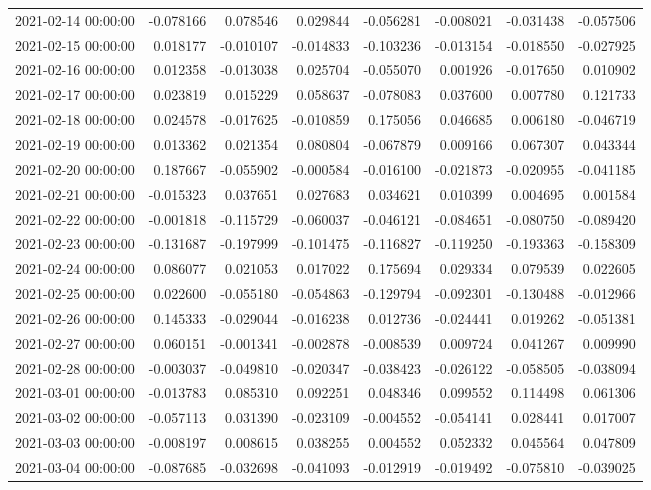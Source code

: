 \begin{tabular}{lrrrrrrr}
2021-02-14 00:00:00 & -0.078166 & 0.078546 & 0.029844 & -0.056281 & -0.008021 & -0.031438 & -0.057506 \\
2021-02-15 00:00:00 & 0.018177 & -0.010107 & -0.014833 & -0.103236 & -0.013154 & -0.018550 & -0.027925 \\
2021-02-16 00:00:00 & 0.012358 & -0.013038 & 0.025704 & -0.055070 & 0.001926 & -0.017650 & 0.010902 \\
2021-02-17 00:00:00 & 0.023819 & 0.015229 & 0.058637 & -0.078083 & 0.037600 & 0.007780 & 0.121733 \\
2021-02-18 00:00:00 & 0.024578 & -0.017625 & -0.010859 & 0.175056 & 0.046685 & 0.006180 & -0.046719 \\
2021-02-19 00:00:00 & 0.013362 & 0.021354 & 0.080804 & -0.067879 & 0.009166 & 0.067307 & 0.043344 \\
2021-02-20 00:00:00 & 0.187667 & -0.055902 & -0.000584 & -0.016100 & -0.021873 & -0.020955 & -0.041185 \\
2021-02-21 00:00:00 & -0.015323 & 0.037651 & 0.027683 & 0.034621 & 0.010399 & 0.004695 & 0.001584 \\
2021-02-22 00:00:00 & -0.001818 & -0.115729 & -0.060037 & -0.046121 & -0.084651 & -0.080750 & -0.089420 \\
2021-02-23 00:00:00 & -0.131687 & -0.197999 & -0.101475 & -0.116827 & -0.119250 & -0.193363 & -0.158309 \\
2021-02-24 00:00:00 & 0.086077 & 0.021053 & 0.017022 & 0.175694 & 0.029334 & 0.079539 & 0.022605 \\
2021-02-25 00:00:00 & 0.022600 & -0.055180 & -0.054863 & -0.129794 & -0.092301 & -0.130488 & -0.012966 \\
2021-02-26 00:00:00 & 0.145333 & -0.029044 & -0.016238 & 0.012736 & -0.024441 & 0.019262 & -0.051381 \\
2021-02-27 00:00:00 & 0.060151 & -0.001341 & -0.002878 & -0.008539 & 0.009724 & 0.041267 & 0.009990 \\
2021-02-28 00:00:00 & -0.003037 & -0.049810 & -0.020347 & -0.038423 & -0.026122 & -0.058505 & -0.038094 \\
2021-03-01 00:00:00 & -0.013783 & 0.085310 & 0.092251 & 0.048346 & 0.099552 & 0.114498 & 0.061306 \\
2021-03-02 00:00:00 & -0.057113 & 0.031390 & -0.023109 & -0.004552 & -0.054141 & 0.028441 & 0.017007 \\
2021-03-03 00:00:00 & -0.008197 & 0.008615 & 0.038255 & 0.004552 & 0.052332 & 0.045564 & 0.047809 \\
2021-03-04 00:00:00 & -0.087685 & -0.032698 & -0.041093 & -0.012919 & -0.019492 & -0.075810 & -0.039025 \\

\end{tabular}
